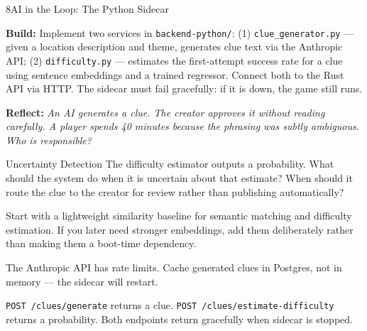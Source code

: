 \documentclass[
  11pt,
  oneside,
  DIV=12,
]{scrartcl}
\newcommand{\build}[1]{\textbf{\color{SpringMoss}Build:} #1}
\newcommand{\reflect}[1]{\textbf{\color{ConceptBlue}Reflect:} \textit{#1}}
\begin{document}
\begin{milestone}{8}{AI in the Loop: The Python Sidecar}

\build{Implement two services in \texttt{backend-python/}:
(1) \texttt{clue\_generator.py} — given a location description and theme,
generates clue text via the Anthropic API;
(2) \texttt{difficulty.py} — estimates the first-attempt success rate
for a clue using sentence embeddings and a trained regressor.
Connect both to the Rust API via HTTP. The sidecar must fail gracefully:
if it is down, the game still runs.}

\medskip
\reflect{An AI generates a clue. The creator approves it without reading
carefully. A player spends 40 minutes because the phrasing was subtly
ambiguous. Who is responsible?}

\begin{hitlconcept}{Uncertainty Detection}
  The difficulty estimator outputs a probability. What should the system
  do when it is uncertain about that estimate? When should it route the
  clue to the creator for review rather than publishing automatically?
\end{hitlconcept}

\begin{hintbox}
  Start with a lightweight similarity baseline for semantic matching and
  difficulty estimation. If you later need stronger embeddings, add them
  deliberately rather than making them a boot-time dependency.
\end{hintbox}

\begin{watchout}
  The Anthropic API has rate limits. Cache generated clues in Postgres,
  not in memory — the sidecar will restart.
\end{watchout}

\begin{checkpoint}
  \texttt{POST /clues/generate} returns a clue. \texttt{POST
  /clues/estimate-difficulty} returns a probability. Both endpoints return
  gracefully when sidecar is stopped.
\end{checkpoint}

\end{milestone}
\end{document}
